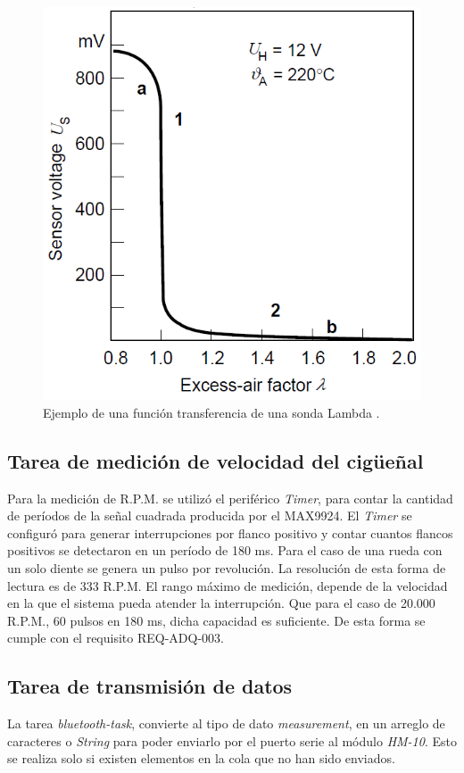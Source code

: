 \begin{figure}[htpb]
\centering
\includegraphics[width=.55\textwidth]{./Figures/funcion-lambda.png}
\caption{Ejemplo de una función transferencia de una sonda Lambda \protect\footnotemark[3].}
\label{fig:funcion-lambda}
\end{figure}

\subsection{Tarea de medición de velocidad del cigüeñal}

Para la medición de R.P.M. se utilizó el periférico \textit{Timer}, para contar la cantidad de períodos de la señal cuadrada producida por el MAX9924. El \textit{Timer} se configuró para generar interrupciones por flanco positivo y contar cuantos flancos positivos se detectaron en un período de 180 ms. Para el caso de una rueda con un solo diente se genera un pulso por revolución. La resolución de esta forma de lectura es de 333 R.P.M. El rango máximo de medición, depende de la velocidad en la que el sistema pueda atender la interrupción. Que para el caso de 20.000 R.P.M., 60 pulsos en 180 ms, dicha capacidad es suficiente. De esta forma se cumple con el requisito REQ-ADQ-003.

\subsection{Tarea de transmisión de datos}

La tarea \textit{bluetooth-task}, convierte al tipo de dato \textit{measurement}, en un arreglo de caracteres o \textit{String} para poder enviarlo por el puerto serie al módulo \textit{HM-10}. Esto se realiza solo si existen elementos en la cola que no han sido enviados.

